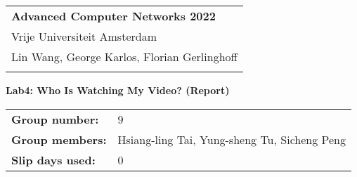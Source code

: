 \documentclass[a4paper,11pt]{article}
\begin{document}
\thispagestyle{empty} 

\begin{tabular}{@{}p{15.5cm}} 
{\bf Advanced Computer Networks 2022} \\
Vrije Universiteit Amsterdam  \\ Lin Wang, George Karlos, Florian Gerlinghoff\\
\hline 
\\
\end{tabular} 

\vspace*{0.3cm} 

{\LARGE \bf Lab4: Who Is Watching My Video? (Report)} 

\vspace*{0.3cm} 


\begin{tcolorbox}[sharp corners, colback=blue!5!white]
\begin{tabular}{@{}ll}
\textbf{Group number:} & 9 \\
\textbf{Group members:} & Hsiang-ling Tai, Yung-sheng Tu, Sicheng Peng \\
\textbf{Slip days used:} & 0 \\
\end{tabular}
\end{tcolorbox}

\vspace{0.4cm}

\end{document}
